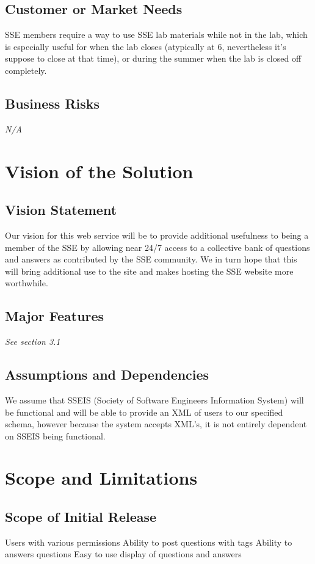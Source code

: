 \documentclass{report}
\begin{document}
    \subsection{Customer or Market Needs}SSE members require a way to use SSE lab materials while not in the lab, which is especially useful for when the lab closes (atypically at 6, nevertheless it's suppose to close at that time), or during the summer when the lab is closed off completely.
    \subsection{Business Risks}      \textit{N/A}  \section{Vision of the Solution}
    \subsection{Vision Statement}
Our vision for this web service will be to provide additional usefulness to being a member of the SSE by allowing near 24/7 access to a collective bank of questions and answers as contributed by the SSE community. We in turn hope that this will bring additional use to the site and makes hosting the SSE website more worthwhile.
    \subsection{Major Features}
      \textit{See section 3.1}
    \subsection{Assumptions and Dependencies}
We assume that SSEIS (Society of Software Engineers Information System) will be functional and will be able to provide an XML of users to our specified schema, however because the system accepts XML's, it is not entirely dependent on SSEIS being functional.
  \section{Scope and Limitations}
    \subsection{Scope of Initial Release}
Users with various permissions
Ability to post questions with tags
Ability to answers questions
Easy to use display of questions and answers
\end{document}
